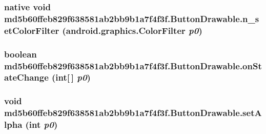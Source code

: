 \hypertarget{classmd5b60ffeb829f638581ab2bb9b1a7f4f3f_1_1_button_drawable_611d0f00b4f853446cfaccf8130ac3ab}{
\subsubsection[{n\_\-setColorFilter}]{\setlength{\rightskip}{0pt plus 5cm}native void md5b60ffeb829f638581ab2bb9b1a7f4f3f.ButtonDrawable.n\_\-setColorFilter (android.graphics.ColorFilter {\em p0})}}
\label{classmd5b60ffeb829f638581ab2bb9b1a7f4f3f_1_1_button_drawable_611d0f00b4f853446cfaccf8130ac3ab}


\hypertarget{classmd5b60ffeb829f638581ab2bb9b1a7f4f3f_1_1_button_drawable_4583a9633a285d9cdc9c112ba85eae43}{
\subsubsection[{onStateChange}]{\setlength{\rightskip}{0pt plus 5cm}boolean md5b60ffeb829f638581ab2bb9b1a7f4f3f.ButtonDrawable.onStateChange (int\mbox{[}$\,$\mbox{]} {\em p0})}}
\label{classmd5b60ffeb829f638581ab2bb9b1a7f4f3f_1_1_button_drawable_4583a9633a285d9cdc9c112ba85eae43}


\hypertarget{classmd5b60ffeb829f638581ab2bb9b1a7f4f3f_1_1_button_drawable_d2ae8f92af86ee4457c747cd1a4d3cdd}{
\subsubsection[{setAlpha}]{\setlength{\rightskip}{0pt plus 5cm}void md5b60ffeb829f638581ab2bb9b1a7f4f3f.ButtonDrawable.setAlpha (int {\em p0})}}
\label{classmd5b60ffeb829f638581ab2bb9b1a7f4f3f_1_1_button_drawable_d2ae8f92af86ee4457c747cd1a4d3cdd}


